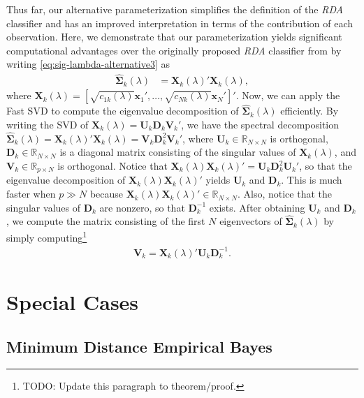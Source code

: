 \documentclass[11pt]{article}
\begin{document}
Thus far, our alternative parameterization simplifies the definition of the \emph{RDA} classifier and has an improved interpretation in terms of the contribution of each observation. Here, we demonstrate that our parameterization yields significant computational advantages over the originally proposed \emph{RDA} classifier from \cite{Friedman:1989tm} by writing \eqref{eq:sig-lambda-alternative3} as
\begin{align*}
	\widehat{\bm\Sigma}_k(\lambda) &= \bm X_k(\lambda)' \bm X_k(\lambda),
\end{align*}
where $\bm X_k(\lambda) = [\sqrt{c_{1k}(\lambda)} \bm x_1', \ldots,  \sqrt{c_{Nk}(\lambda)} \bm x_N']'$. Now, we can apply the Fast SVD to compute the eigenvalue decomposition of $\widehat{\bm\Sigma}_k(\lambda)$ efficiently. By writing the SVD of $\bm X_k(\lambda) = \bm U_k \bm D_k \bm V_k'$, we have the spectral decomposition $\widehat{\bm\Sigma}_k(\lambda) = \bm X_k(\lambda)' \bm X_k(\lambda) = \bm V_k \bm D_k^2 \bm V_k'$, where $\bm U_k \in \mathbb{R}_{N \times N}$ is orthogonal, $\bm D_k \in \mathbb{R}_{N \times N}$ is a diagonal matrix consisting of the singular values of $\bm X_k(\lambda)$, and $\bm V_k \in \mathbb{R}_{p \times N}$ is orthogonal. Notice that $\bm X_k(\lambda)\bm X_k(\lambda)' = \bm U_k \bm D_k^2 \bm U_k'$, so that the eigenvalue decomposition of $\bm X_k(\lambda)\bm X_k(\lambda)'$ yields $\bm U_k$ and $\bm D_k$. This is much faster when $p \gg N$ because $\bm X_k(\lambda)\bm X_k(\lambda)' \in \mathbb{R}_{N \times N}$. Also, notice that the singular values of $\bm D_k$ are nonzero, so that $\bm D_k^{-1}$ exists. After obtaining $\bm U_k$ and $\bm D_k$, we compute the matrix consisting of the first $N$ eigenvectors of $\widehat{\bm\Sigma}_k(\lambda)$ by simply computing\footnote{TODO: Update this paragraph to theorem/proof.}
\begin{align*}
	\bm V_k = \bm X_k(\lambda)' \bm U_k \bm D_k^{-1}.
\end{align*}

\section{Special Cases}

\subsection{Minimum Distance Empirical Bayes}
\end{document}
